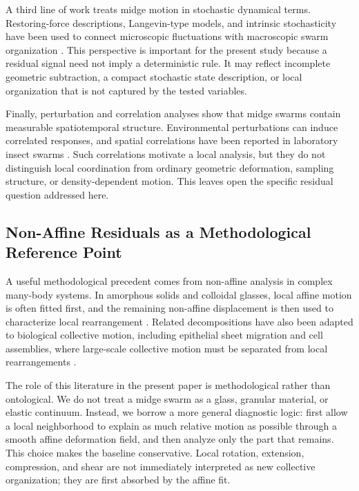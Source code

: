A third line of work treats midge motion in stochastic dynamical terms.
Restoring-force descriptions, Langevin-type models, and intrinsic
stochasticity have been used to connect microscopic fluctuations with
macroscopic swarm organization
\cite{reynolds2017_velocity_gravity,reynolds2018_langevin,reynolds2021_intrinsic}.
This perspective is important for the present study because a residual signal
need not imply a deterministic rule. It may reflect incomplete geometric
subtraction, a compact stochastic state description, or local organization that
is not captured by the tested variables.

Finally, perturbation and correlation analyses show that midge swarms contain
measurable spatiotemporal structure. Environmental perturbations can induce
correlated responses, and spatial correlations have been reported in
laboratory insect swarms
\cite{vandervaart2020_perturbations,reynolds2024_spatial}. Such correlations
motivate a local analysis, but they do not distinguish local coordination from
ordinary geometric deformation, sampling structure, or density-dependent
motion. This leaves open the specific residual question addressed here.

\subsection{Non-Affine Residuals as a Methodological Reference Point}

A useful methodological precedent comes from non-affine analysis in complex
many-body systems. In amorphous solids and colloidal glasses, local affine
motion is often fitted first, and the remaining non-affine displacement is then
used to characterize local rearrangement
\cite{falk1998_viscoplastic,chikkadi2012_nonaffine}. Related decompositions
have also been adapted to biological collective motion, including epithelial
sheet migration and cell assemblies, where large-scale collective motion must
be separated from local rearrangements
\cite{lee2013_epithelial,cerbino2021_disentangling}.

The role of this literature in the present paper is methodological rather than
ontological. We do not treat a midge swarm as a glass, granular material, or
elastic continuum. Instead, we borrow a more general diagnostic logic: first
allow a local neighborhood to explain as much relative motion as possible
through a smooth affine deformation field, and then analyze only the part that remains. This
choice makes the baseline conservative. Local rotation, extension,
compression, and shear are not immediately interpreted as new collective
organization; they are first absorbed by the affine fit.

